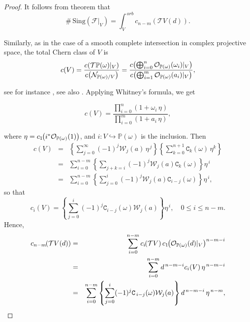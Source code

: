 \documentclass[11pt]{amsart}
\theoremstyle{plain}
\theoremstyle{definition}
\begin{document}
\begin{proof} It follows from theorem \cite[Theorem 1]{Mig} that
$$\#\,\mathrm{Sing}(\mathcal{F}|_V)=\int^{\,orb}_Vc_{n-m}\left(\mathcal{T}V(d)\right).$$

Similarly, as in the case of a smooth complete intersection in complex projective space,
the total Chern class of $V$ is
$$
c(V)=\frac{c\hspace{-0,5mm}\left(\mathcal{T}\mathbb{P}(\omega)|_V\right)}
{c\hspace{-0,5mm}\left(\mathcal{N}_{\mathbb{P}(\omega)/V}\right)}
=\frac{c\hspace{-0,5mm}\left(\bigoplus_{i=0}^n\mathcal{O}_{\mathbb{P}(\omega)}(\omega_i)|_V\right)}
{c\hspace{-0,5mm}\left(\bigoplus_{i=1}^m\mathcal{O}_{\mathbb{P}(\omega)}(a_i)|_V\right)},
$$

\vskip 0.2cm
\noindent see for instance \cite{WAWA}, see also \cite{Mig,EiHa,Mar}. Applying Whitney's formula, we get 

$$c(V)=\frac{\prod_{i=0}^n\left(1+\omega_i\,\eta\right)}{\prod_{i=0}^m\left(1+a_i\,\eta\right)},$$

\noindent where $\eta=c_1\hspace{-1mm}\left(i^{\ast}\mathcal{O}_{\mathbb{P}(\omega)}(1)\right)$, and $i:V\hookrightarrow\mathbb{P}(\omega)$ 
is the inclusion. Then 
\begin{eqnarray*}
c(V)&=&\left\{\sum_{j=0}^{\infty}(-1)^{j}\mathcal{W}_j(a)\,\eta^{\,j}\right\}
\left\{\sum_{k=0}^{n+1}\texttt{C}_{k}(\omega)\,\eta^k\right\} \\
&=& \sum_{i=0}^{n-m}\left\{\sum_{j+k=i}(-1)^{j}\mathcal{W}_j(a)\texttt{C}_{k}(\omega)\right\}\eta^{\,i} \\
&=& \sum_{i=0}^{n-m}\left\{\sum_{j=0}^{i}(-1)^{j}\mathcal{W}_j(a)\texttt{C}_{i-j}(\omega)\right\}\eta^{\,i},
\end{eqnarray*}
so that
$$c_i(V)=\left\{\sum_{j=0}^{i}(-1)^{j}\texttt{C}_{i-j}(\omega)\mathcal{W}_j(a)\right\}\eta^{\,i},\,\,\,\,\,\,0\leq i\leq n-m.$$
Hence,
\begin{eqnarray*}
c_{n-m}\hspace{-1mm}\left(\mathcal{T}V(d)\right)
&=&\sum_{i=0}^{n-m}c_i\hspace{-1mm}\left(\mathcal{T}V\right)
c_1\hspace{-1mm}\left(\mathcal{O}_{\mathbb{P}(\omega)}(d)|_V\right)^{n-m-i} \\
&=&\sum_{i=0}^{n-m}d^{\,n-m-i}c_i(V)\,\eta^{\,n-m-i} \\
&=&\sum_{i=0}^{n-m} \left\{\sum_{j=0}^i(-1)^j\texttt{C}_{\,i-j}(\omega)\mathcal{W}_j(a)\right\}d^{\,n-m-i}\,\eta^{\,n-m},
\end{eqnarray*}


\end{proof}
\end{document}
